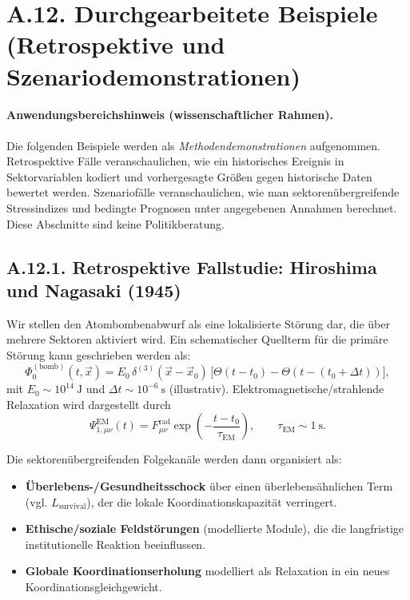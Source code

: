 \documentclass[13pt,a4paper]{article}
\begin{document}
	\section*{A.12. Durchgearbeitete Beispiele (Retrospektive und Szenariodemonstrationen)}
	\label{sec:worked-examples}
	
	\paragraph{Anwendungsbereichshinweis (wissenschaftlicher Rahmen).}
	Die folgenden Beispiele werden als \emph{Methodendemonstrationen} aufgenommen. Retrospektive Fälle veranschaulichen, wie ein historisches Ereignis in Sektorvariablen kodiert und vorhergesagte Größen gegen historische Daten bewertet werden. Szenariofälle veranschaulichen, wie man sektorenübergreifende Stressindizes und bedingte Prognosen unter angegebenen Annahmen berechnet. Diese Abschnitte sind keine Politikberatung.
	
	\subsection*{A.12.1. Retrospektive Fallstudie: Hiroshima und Nagasaki (1945)}
	
	Wir stellen den Atombombenabwurf als eine lokalisierte Störung dar, die über mehrere Sektoren aktiviert wird. Ein schematischer Quellterm für die primäre Störung kann geschrieben werden als:
	$$ \Phi_{0}^{(\mathrm{bomb})}(t,\vec{x}) = E_0\,\delta^{(3)}(\vec{x}-\vec{x}_0)\,\big[\Theta(t-t_0)-\Theta(t-(t_0+\Delta t))\big], $$
	mit $E_0\sim 10^{14}\ \mathrm{J}$ und $\Delta t\sim 10^{-6}\ \mathrm{s}$ (illustrativ). Elektromagnetische/strahlende Relaxation wird dargestellt durch
	$$ \Psi_{1,\mu\nu}^{\mathrm{EM}}(t)=F_{\mu\nu}^{\mathrm{rad}}\exp\!\left(-\frac{t-t_0}{\tau_{\mathrm{EM}}}\right),\qquad \tau_{\mathrm{EM}}\sim 1\ \mathrm{s}. $$
	
	Die sektorenübergreifenden Folgekanäle werden dann organisiert als:
	\begin{itemize}[leftmargin=*]
		\item \textbf{Überlebens-/Gesundheitsschock} über einen überlebensähnlichen Term (vgl. $L_{\mathrm{survival}}$), der die lokale Koordinationskapazität verringert.
		\item \textbf{Ethische/soziale Feldstörungen} (modellierte Module), die die langfristige institutionelle Reaktion beeinflussen.
		\item \textbf{Globale Koordinationserholung} modelliert als Relaxation in ein neues Koordinationsgleichgewicht.
	\end{itemize}
	
\end{document}
